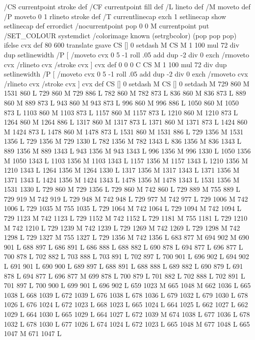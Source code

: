{{{{{{{{{{{{{{{{{{/CS { currentpoint stroke } def
/CF { currentpoint fill } def
/L { lineto } def /M { moveto } def
/P { moveto 0 1 rlineto stroke } def
/T { currentlinecap exch 1 setlinecap show setlinecap } def
errordict /nocurrentpoint { pop 0 0 M currentpoint } put
/SET_COLOUR systemdict /colorimage known
{ (setrgbcolor) } { (pop pop pop) } ifelse cvx def
 80 600 translate
gsave
CS [] 0 setdash M
CS M 1 100 mul 72 div dup setlinewidth
/P [ /moveto cvx 0 5 -1 roll .05 add dup -2 div 0 exch /rmoveto cvx /rlineto cvx /stroke cvx ] cvx def
 0 0 0 C
CS M 1 100 mul 72 div dup setlinewidth
/P [ /moveto cvx 0 5 -1 roll .05 add dup -2 div 0 exch /rmoveto cvx /rlineto cvx /stroke cvx ] cvx def
CS [] 0 setdash M
CS [] 0 setdash M
729 860 M 1531 860 L
729 860 M 729 886 L
782 860 M 782 873 L
836 860 M 836 873 L
889 860 M 889 873 L
943 860 M 943 873 L
996 860 M 996 886 L
1050 860 M 1050 873 L
1103 860 M 1103 873 L
1157 860 M 1157 873 L
1210 860 M 1210 873 L
1264 860 M 1264 886 L
1317 860 M 1317 873 L
1371 860 M 1371 873 L
1424 860 M 1424 873 L
1478 860 M 1478 873 L
1531 860 M 1531 886 L
729 1356 M 1531 1356 L
729 1356 M 729 1330 L
782 1356 M 782 1343 L
836 1356 M 836 1343 L
889 1356 M 889 1343 L
943 1356 M 943 1343 L
996 1356 M 996 1330 L
1050 1356 M 1050 1343 L
1103 1356 M 1103 1343 L
1157 1356 M 1157 1343 L
1210 1356 M 1210 1343 L
1264 1356 M 1264 1330 L
1317 1356 M 1317 1343 L
1371 1356 M 1371 1343 L
1424 1356 M 1424 1343 L
1478 1356 M 1478 1343 L
1531 1356 M 1531 1330 L
729 860 M 729 1356 L
729 860 M 742 860 L
729 889 M 755 889 L
729 919 M 742 919 L
729 948 M 742 948 L
729 977 M 742 977 L
729 1006 M 742 1006 L
729 1035 M 755 1035 L
729 1064 M 742 1064 L
729 1094 M 742 1094 L
729 1123 M 742 1123 L
729 1152 M 742 1152 L
729 1181 M 755 1181 L
729 1210 M 742 1210 L
729 1239 M 742 1239 L
729 1269 M 742 1269 L
729 1298 M 742 1298 L
729 1327 M 755 1327 L
729 1356 M 742 1356 L
683 877 M 694 902 M 690 901 L
688 897 L
686 891 L
686 888 L
688 882 L
690 878 L
694 877 L
696 877 L
700 878 L
702 882 L
703 888 L
703 891 L
702 897 L
700 901 L
696 902 L
694 902 L
691 901 L
690 900 L
689 897 L
688 891 L
688 888 L
689 882 L
690 879 L
691 878 L
694 877 L
696 877 M 699 878 L
700 879 L
701 882 L
702 888 L
702 891 L
701 897 L
700 900 L
699 901 L
696 902 L
659 1023 M 665 1048 M 662 1036 L
665 1038 L
668 1039 L
672 1039 L
676 1038 L
678 1036 L
679 1032 L
679 1030 L
678 1026 L
676 1024 L
672 1023 L
668 1023 L
665 1024 L
664 1025 L
662 1027 L
662 1029 L
664 1030 L
665 1029 L
664 1027 L
672 1039 M 674 1038 L
677 1036 L
678 1032 L
678 1030 L
677 1026 L
674 1024 L
672 1023 L
665 1048 M 677 1048 L
665 1047 M 671 1047 L
}}}}}}}}}}}}}}}}}}
